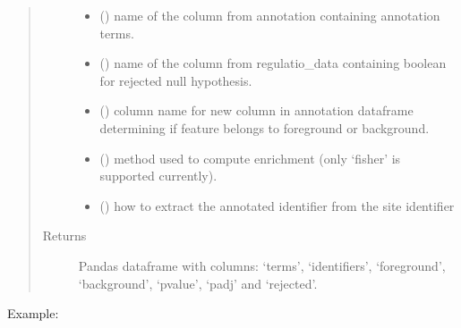 \documentclass[letterpaper,10pt,english]{sphinxmanual}
\begin{document}
\begin{fulllineitems}
\begin{quote}
\begin{description}
\begin{itemize}
\item {} 
 () \textendash{} name of the column from annotation containing annotation terms.

\item {} 
 () \textendash{} name of the column from regulatio\_data containing boolean for rejected null hypothesis.

\item {} 
 () \textendash{} column name for new column in annotation dataframe determining if feature belongs to foreground or background.

\item {} 
 () \textendash{} method used to compute enrichment (only ‘fisher’ is supported currently).

\item {} 
 () \textendash{} how to extract the annotated identifier from the site identifier

\end{itemize}

\item[{Returns}] \leavevmode
Pandas dataframe with columns: ‘terms’, ‘identifiers’, ‘foreground’, ‘background’, ‘pvalue’, ‘padj’ and ‘rejected’.

\end{description}\end{quote}

Example:


\end{fulllineitems}
\end{document}

